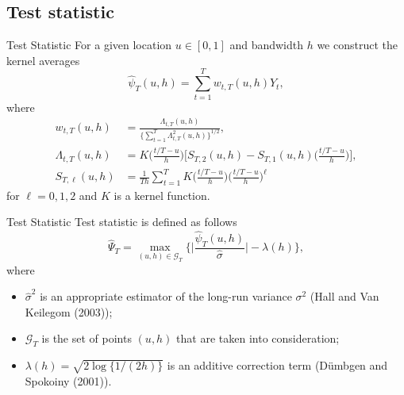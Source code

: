 \documentclass[10pt, handout]{beamer}
\begin{document}
\subsection{Test statistic}
\begin{frame}{Test Statistic}
For a given location $u \in [0,1]$ and bandwidth $h$ we construct the kernel averages
\begin{equation*}
\widehat{\psi}_T(u,h) = \sum\limits_{t=1}^T w_{t,T}(u,h) Y_t, 
\end{equation*}\pause
\vspace{-3mm}
where 
\begin{align*}
w_{t,T}(u,h) &= \frac{\Lambda_{t,T}(u,h)}{ \{\sum\nolimits_{t=1}^T \Lambda_{t,T}^2(u,h)\}^{1/2} } ,\\
\Lambda_{t,T}(u,h) &= K\Big(\frac{t/T-u}{h}\Big) \Big[ S_{T,2}(u,h) - S_{T,1}(u,h) \Big(\frac{t/T-u}{h}\Big) \Big], \\
S_{T,\ell}(u,h) &= \frac{1}{Th} \sum\nolimits_{t=1}^T K\Big(\frac{t/T-u}{h}\Big) \Big(\frac{t/T-u}{h}\Big)^\ell
\end{align*}
for $\ell = 0,1,2$ and $K$ is a kernel function.
\end{frame}

\begin{frame}[label = frame_teststatistic]{Test Statistic}
Test statistic is defined as follows
\begin{equation*}
\widehat{\Psi}_T = \max_{(u,h) \in \mathcal{G}_T} \Big\{ \Big|\frac{\widehat{\psi}_T(u,h)}{\widehat{\sigma}}\Big| - \lambda(h) \Big\}, 
\end{equation*} \pause
where 
\begin{itemize}
\item $\widehat{\sigma}^2$ is an appropriate estimator of the long-run variance $\sigma^2$ (Hall and Van Keilegom (2003));
\item $\mathcal{G}_T$ is the set of points $(u,h)$ that are taken into consideration;
\item $\lambda(h) = \sqrt{2 \log \{ 1/(2h) \}}$ is an additive correction term (D{\"u}mbgen and Spokoiny (2001)). \hyperlink{frame_lambda}{}
\end{itemize}
\end{frame}
\end{document}
